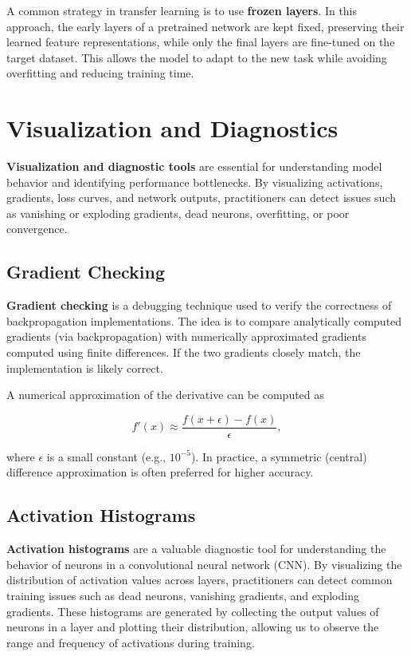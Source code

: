 \documentclass{article}
\begin{document}
A common strategy in transfer learning is to use \textbf{frozen layers}. In this approach, the early layers of a pretrained network are kept fixed, preserving their learned feature representations, while only the final layers are fine-tuned on the target dataset. This allows the model to adapt to the new task while avoiding overfitting and reducing training time.


\section{Visualization and Diagnostics}

\textbf{Visualization and diagnostic tools} are essential for understanding model behavior and identifying performance bottlenecks. By visualizing activations, gradients, loss curves, and network outputs, practitioners can detect issues such as vanishing or exploding gradients, dead neurons, overfitting, or poor convergence.

\subsection{Gradient Checking}

\textbf{Gradient checking} is a debugging technique used to verify the correctness of backpropagation implementations. The idea is to compare analytically computed gradients (via backpropagation) with numerically approximated gradients computed using finite differences. If the two gradients closely match, the implementation is likely correct.

A numerical approximation of the derivative can be computed as

\[
f'(x) \approx \frac{f(x + \epsilon) - f(x)}{\epsilon},
\]

where \(\epsilon\) is a small constant (e.g., \(10^{-5}\)). In practice, a symmetric (central) difference approximation is often preferred for higher accuracy.


\subsection{Activation Histograms}

\textbf{Activation histograms} are a valuable diagnostic tool for understanding the behavior of neurons in a convolutional neural network (CNN). By visualizing the distribution of activation values across layers, practitioners can detect common training issues such as dead neurons, vanishing gradients, and exploding gradients. These histograms are generated by collecting the output values of neurons in a layer and plotting their distribution, allowing us to observe the range and frequency of activations during training.
\end{document}
